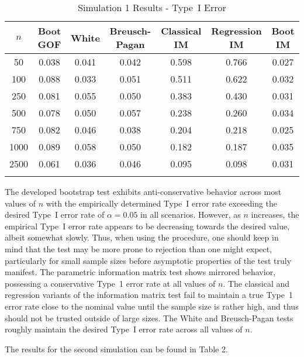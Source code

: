 \documentclass[sn-mathphys-ay]{sn-jnl}
\begin{document}
\begin{table}[h]
\caption{Simulation 1 Results - Type~I Error}\label{sim1tab}%
\begin{tabular}{ c|c|c|c|c|c|c}
\toprule
$n$ & Boot GOF & White & Breusch-Pagan & Classical IM & Regression IM & Boot IM \\
\midrule
50 & 0.038 & 0.041 & 0.042 & 0.598 & 0.766 & 0.027 \\
100 & 0.088 & 0.033 & 0.051 & 0.511 & 0.622 & 0.032 \\
250 & 0.081 & 0.055 & 0.050 & 0.383 & 0.430 & 0.031 \\
500 & 0.078 & 0.050 & 0.057 & 0.238 & 0.260 & 0.034 \\
750 & 0.082 & 0.046 & 0.038 & 0.204 & 0.218 & 0.025 \\
1000 & 0.089 & 0.058 & 0.050 & 0.182 & 0.187 & 0.035 \\
2500 & 0.061 & 0.036 & 0.046 & 0.095 & 0.098 & 0.031 \\
\botrule
\end{tabular}

\end{table}

The developed bootstrap test exhibits anti-conservative behavior across most values of $n$ with the empirically determined Type~I error rate exceeding the desired Type~I error rate
of $\alpha = 0.05$ in all scenarios. However, as $n$ increases, the empirical Type~I error rate appears to be decreasing towards the desired value, albeit somewhat slowly. Thus, when
using the procedure, one should keep in mind that the test may be more prone to
rejection than one might expect, particularly for small sample sizes before asymptotic properties of the test truly manifest. The parametric information matrix test shows mirrored behavior,
possessing a conservative Type~1 error rate at all values of $n$. The classical and regression variants of the information matrix test fail to maintain a true Type~1 error rate close
to the nominal value until the sample size is rather high, and thus should not be trusted outside of large sizes. The White and Breusch-Pagan tests roughly maintain the desired Type~I error rate across all values of $n$.

The results for the second simulation can be found in Table 2.
\end{document}
